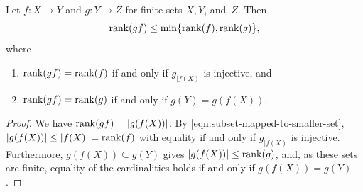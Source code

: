 \begin{proposition} \label{prelim:prop:rank-defect}
	Let $f \colon X \to Y$ and $g \colon Y \to Z$
	for finite sets $X, Y$, and~$Z$. Then
	\begin{equation} \label{prelim:prop:item:rank-eqn}
		\rank{\concat{f}{g}} \le \min\{ \rank{f}, \rank{g} \},
	\end{equation}
	where
	\begin{enumerate}
		\item \label{prelim:prop:item:rank-eqn:f} $\rank{\concat{f}{g}} = \rank{f}$
		if and only if $g_{|f(X)}$ is injective, and
		\item \label{prelim:prop:item:rank-eqn:g} $\rank{\concat{f}{g}} = \rank{g}$
		if and only if $g(Y) = g(f(X))$.
	\end{enumerate}
\end{proposition}
\begin{proof}
	We have $\rank{\concat{f}{g}} = |g(f(X))|$.
	By \cref{eqn:subset-mapped-to-smaller-set},
	$|g(f(X))| \le |f(X)| = \rank{f}$
	with equality if and only if $g_{|f(X)}$ is injective.
	Furthermore, $g(f(X)) \subseteq g(Y)$ gives $|g(f(X))| \le \rank{g}$,
	and, as these sets are finite, equality of the cardinalities holds
	if and only if $g(f(X)) = g(Y)$.
\end{proof}

